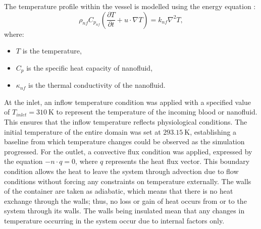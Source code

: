 \documentclass[10pt]{NSP1}
\begin{document}
	The temperature profile within the vessel is modelled using the energy equation \cite{Rezazadeh2022,AhmedMishra2026}:
	\begin{equation}\label{eq:energy}
		\rho_{nf}C_{p_{nf}}\left( \frac{\partial T}{\partial t} + u \cdot \nabla T \right) = k_{nf}\nabla^{2}T,
	\end{equation}
	where:
	\begin{itemize}
		\item $T$ is the temperature,
		\item $C_{p}$ is the specific heat capacity of nanofluid,
		\item $\kappa_{nf}$ is the thermal conductivity of the nanofluid.
	\end{itemize}
	
	At the inlet, an inflow temperature condition was applied with a specified value of $T_{inlet} = 310\ \mathrm{K}$ to represent the temperature of the incoming blood or nanofluid. This ensures that the inflow temperature reflects physiological conditions. The initial temperature of the entire domain was set at $293.15\ \mathrm{K}$, establishing a baseline from which temperature changes could be observed as the simulation progressed. For the outlet, a convective flux condition was applied, expressed by the equation $- n \cdot q = 0$, where $q$ represents the heat flux vector. This boundary condition allows the heat to leave the system through advection due to flow conditions without forcing any constraints on temperature externally. The walls of the container are taken as adiabatic, which means that there is no heat exchange through the walls; thus, no loss or gain of heat occurs from or to the system through its walls. The walls being insulated mean that any changes in temperature occurring in the system occur due to internal factors only.
	
\end{document}

